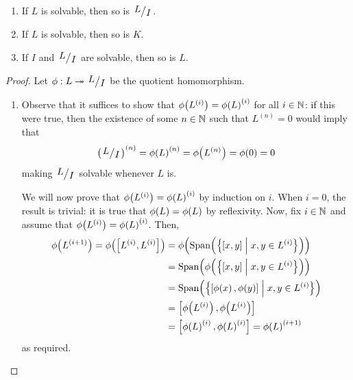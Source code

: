 \begin{boxproposition}\label{Ch1:Prop:SolvabilityConditions}
    \hfill
    \begin{enumerate}[label = \normalfont\arabic*., noitemsep]
        \item If $L$ is solvable, then so is $\quotient{L}{I}$.
        \item If $L$ is solvable, then so is $K$.
        \item If $I$ and $\quotient{L}{I}$ are solvable, then so is $L$.
    \end{enumerate}
\end{boxproposition}
\begin{proof}
    Let $\phi : L \surj \quotient{L}{I}$ be the quotient homomorphism.
    \begin{enumerate}
        \item Observe that it suffices to show that $\phi\!\left( L^{(i)} \right) = \phi\!\left( L \right)^{(i)}$ for all $i \in \mathbb{N}$: if this were true, then the existence of some $n \in \mathbb{N}$ such that $L^{(n)} = 0$ would imply that
        \begin{align*}
            \parenth{\quotient{L}{I}}^{(n)} = \phiof{L}^{(n)} = \phiof{L^{(n)}} = \phiof{0} = 0
        \end{align*}
        making $\quotient{L}{I}$ solvable whenever $L$ is.
        
        We will now prove that $\phi\!\left( L^{(i)} \right) = \phi\!\left( L \right)^{(i)}$ by induction on $i$. When $i = 0$, the result is trivial: it is true that $\phi\!\left( L \right) = \phi\!\left( L \right)$ by reflexivity. %
        Now, fix $i \in \mathbb{N}$ and assume that $\phi\!\left( L^{(i)} \right) = \phi\!\left( L \right)^{(i)}$. Then,
        \begin{align*}
            \phiof{L^{(i + 1)}} = \phiof{\brac{L^{(i)}, L^{(i)}}}
            &= \phiof{\Span{\setst{\brac{x,y}}{x, y \in L^{(i)}}}} \\
            &= \Span{\phiof{\setst{\brac{x,y}}{x, y \in L^{(i)}}}} \\
            &= \Span{\setst{\brac{\phiof{x}, \phiof{y}}}{x, y \in L^{(i)}}} \\
            &= \brac{\phiof{L^{(i)}}, \phiof{L^{(i)}}} \\
            &= \brac{\phiof{L}^{(i)}, \phiof{L}^{(i)}} = \phiof{L}^{(i + 1)}
        \end{align*}
        as required.


\end{enumerate}
\end{proof}
